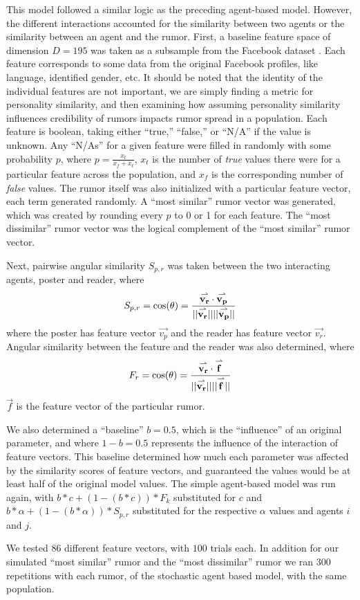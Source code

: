 This model followed a similar logic as the preceding agent-based model. However,
the different interactions accounted for the similarity between two agents or
the similarity between an agent and the rumor. First, a baseline feature space
of dimension $ D = 195 $ was taken as a subsample from the Facebook dataset
\cite{mcauley-2014}. Each feature corresponds to some data from the original
Facebook profiles, like language, identified gender, etc. It should be noted
that the identity of the individual features are not important, we are simply
finding a metric for personality similarity, and then examining how assuming
personality similarity influences credibility of rumors impacts rumor spread in
a population. Each feature is boolean, taking either ``true,'' ``false,'' or
``N/A'' if the value is unknown. Any ``N/As'' for a given feature were filled in
randomly with some probability $ p $, where $ p = \frac{x_{t}}{x_{f} + x_{t}} $, $
x_{t} $ is the number of \textit{true} values there were for a particular
feature across the population, and $ x_{f} $ is the corresponding number of
\textit{false} values. The rumor itself was also initialized with a particular
feature vector, each term generated randomly. A ``most similar'' rumor vector was
generated, which was created by rounding every $ p $ to 0 or 1 for each feature.
The ``most dissimilar'' rumor vector was the logical complement of the ``most
similar'' rumor vector.

Next, pairwise angular similarity $ S_{p,r} $ was taken between the two
interacting agents, poster and reader, where $$ S_{p,r} = \cos(\theta) =
\frac{\overset{\rightharpoonup}{\mathbf{v_r}}\cdot\overset{\rightharpoonup}{\mathbf{v_p}}}{\lvert\lvert \overset{\rightharpoonup}{\mathbf{v_r}} \rvert\rvert \lvert\lvert \overset{\rightharpoonup}{\mathbf{v_p}} \rvert\rvert} $$ where the
poster has feature vector $ \vec{v_p} $ and the reader has feature vector $
\vec{v_r} $. Angular similarity between the feature and the reader was also
determined, where $$ F_r  = \cos(\theta) =
\frac{\overset{\rightharpoonup}{\mathbf{v_r}}\cdot\overset{\rightharpoonup}{\mathbf{f}}}{\lvert\lvert \overset{\rightharpoonup}{\mathbf{v_r}} \rvert\rvert \lvert\lvert \overset{\rightharpoonup}{\mathbf{f}} \rvert\rvert} $$ $ \vec{f} $ is
the feature vector of the particular rumor.

We also determined a ``baseline'' $ b = 0.5 $, which is the ``influence'' of an
original parameter, and where $ 1 - b = 0.5 $ represents the influence of the
interaction of feature vectors. This baseline determined how much each parameter
was affected by the similarity scores of feature vectors, and guaranteed the
values would be at least half of the original model values. The simple
agent-based model was run again, with $ b*c + (1-(b*c))*F_k $ substituted for $
c $ and $ b*\alpha + (1-(b*\alpha))*S_{p,r} $ substituted for the respective $
\alpha $ values and agents $ i $ and $ j $.

We tested $ 86 $ different feature vectors, with $ 100 $ trials each. In
addition for our simulated ``most similar'' rumor and the ``most dissimilar''
rumor  we ran $ 300 $ repetitions with each rumor, of the stochastic agent based
model, with the same population.
